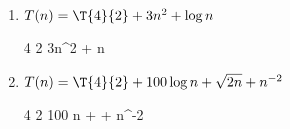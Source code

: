 \documentclass{lehramt-informatik-aufgabe}
\begin{document}
\begin{enumerate}


\item $T(n) = \T{4}{2} + 3n^2 + \log n$

\begin{liAntwort}
\liMasterVariablenDeklaration
{4} %
{2} %
{3n^2 + \log n} %

\liMasterFallRechnung
{}
{}
{}

\liMasterWolframLink{}
\end{liAntwort}



\item $T(n)= \T{4}{2} + 100 \log n + \sqrt{2n} + n^{-2}$

\begin{liAntwort}
\liMasterVariablenDeklaration
{4} %
{2} %
{100 \log n +  + n^{-2}} %

\liMasterFallRechnung
{}
{}
{}

\liMasterWolframLink{}
\end{liAntwort}

\end{enumerate}
\end{document}
